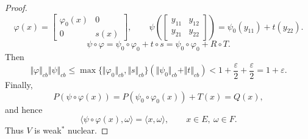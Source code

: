 \documentclass[12pt]{article}
\theoremstyle{definition}
\theoremstyle{remark}
\begin{document}
\begin{proof}
\[
\varphi(x) = \begin{bmatrix} \varphi_0(x) & 0 \\ 0 & s(x) \end{bmatrix},
\qquad
\psi\left( \begin{bmatrix} y_{11} & y_{12} \\ y_{21} & y_{22} \end{bmatrix} \right)
= \psi_0(y_{11}) + t(y_{22}).
\]
\[
\psi\circ\varphi = \psi_0\circ\varphi_0 + t\circ s = \psi_0\circ\varphi_0+R\circ T.
\]
Then
\[
\Vert\varphi\Vert_{cb}\Vert\psi\Vert_{cb}
\leq\max\{\Vert\varphi_0\Vert_{cb}, \Vert s\Vert_{cb}\} (\Vert\psi_0\Vert_{cb} + \Vert t\Vert_{cb})
<1+\frac{\varepsilon}{2}+\frac{\varepsilon}{2}=1+\varepsilon.
\]
Finally,
\[
P(\psi\circ\varphi(x))
=P(\psi_0\circ\varphi_0(x))+T(x)
=Q(x),
\]
and hence
\[
\langle\psi\circ\varphi(x),\omega\rangle
=\langle x,\omega\rangle,\qquad x\in E,\ \omega\in F.
\]
Thus $V$ is weak$^{*}$ nuclear.
\end{proof}
\end{document}
